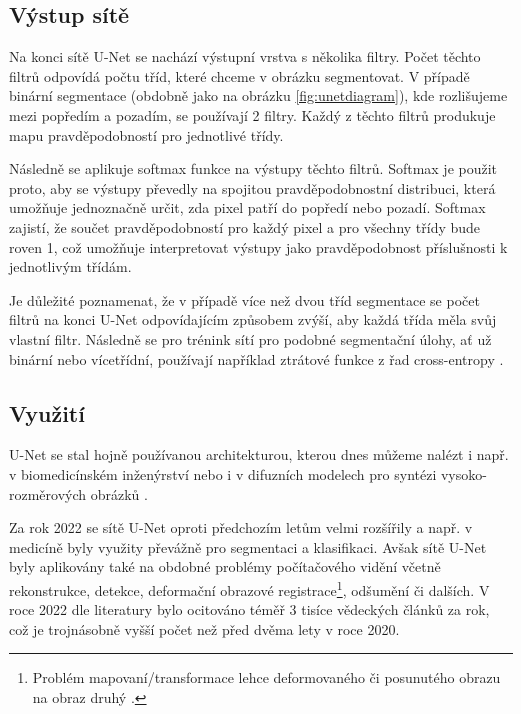\subsection{Výstup sítě}
\label{subsec:Chapter222}

Na konci sítě U-Net se nachází výstupní vrstva s několika filtry. Počet těchto filtrů odpovídá počtu tříd, které chceme v obrázku segmentovat. V případě binární segmentace (obdobně jako na obrázku \ref{fig:unetdiagram}), kde rozlišujeme mezi popředím a pozadím, se používají 2 filtry. Každý z těchto filtrů produkuje mapu pravděpodobností pro jednotlivé třídy.

Následně se aplikuje softmax funkce na výstupy těchto filtrů. Softmax je použit proto, aby se výstupy převedly na spojitou pravděpodobnostní distribuci, která umožňuje jednoznačně určit, zda pixel patří do popředí nebo pozadí. Softmax zajistí, že součet pravděpodobností pro každý pixel a pro všechny třídy bude roven 1, což umožňuje interpretovat výstupy jako pravděpodobnost příslušnosti k jednotlivým třídám.

Je důležité poznamenat, že v případě více než dvou tříd segmentace se počet filtrů na konci U-Net odpovídajícím způsobem zvýší, aby každá třída měla svůj vlastní filtr. Následně se pro trénink sítí pro podobné segmentační úlohy, ať už binární nebo vícetřídní, používají například ztrátové funkce z řad cross-entropy \cite{unet}.

\subsection{Využití}
\label{subsec:Chapter223}

U-Net se stal hojně používanou architekturou, kterou dnes můžeme nalézt i např. v biomedicínském inženýrství \cite{unet_success} nebo i v difuzních modelech pro syntézi vysoko-rozměrových obrázků \cite{stablediffusion}.

Za rok 2022 se sítě U-Net oproti předchozím letům velmi rozšířily a např. v medicíně byly využity převážně pro segmentaci a klasifikaci. Avšak sítě U-Net byly aplikovány také na obdobné problémy počítačového vidění včetně rekonstrukce, detekce, deformační obrazové registrace\footnote{Problém mapovaní/transformace lehce deformovaného či posunutého obrazu na obraz druhý \cite{unet_registration}.}, odšumění či dalších. V roce 2022 dle literatury \cite{unet_success} bylo ocitováno téměř 3 tisíce vědeckých článků za rok, což je trojnásobně vyšší počet než před dvěma lety v roce 2020.

\endinput